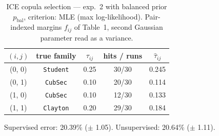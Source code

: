 \begin{table}[htbp]
  \centering
  \caption{ICE copula selection — exp.\ 2 with balanced prior $p_{\text{bal}}$, criterion: MLE (max log-likelihood). Pair-indexed margins $f_{ij}$ of Table~1, second Gaussian parameter read as a variance.}
  \label{tab:exp3-exp2_bal_p__mle}
  \begin{tabular}{ccccc}
    \toprule
    $(i, j)$ & true family & $\tau_{ij}$ & hits / runs & $\hat\tau_{ij}$ \\
    \midrule
    (0, 0) & \texttt{Student} & 0.25 & 30/30 & 0.245 \\
    (0, 1) & \texttt{CubSec} & 0.10 & 20/30 & 0.114 \\
    (1, 0) & \texttt{CubSec} & 0.10 & 12/30 & 0.133 \\
    (1, 1) & \texttt{Clayton} & 0.20 & 29/30 & 0.184 \\
    \bottomrule
  \end{tabular}
  \par\smallskip Supervised error: 20.39\% ($\pm$ 1.05). Unsupervised: 20.64\% ($\pm$ 1.11).
\end{table}
